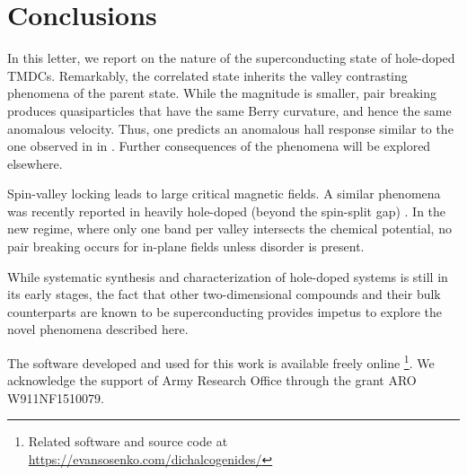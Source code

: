 \section{Conclusions}

In this letter, we report on the nature of the superconducting state
of hole-doped TMDCs.
Remarkably, the correlated state inherits
the valley contrasting phenomena of the parent state.
While the magnitude is smaller, pair breaking produces quasiparticles
that have the same Berry curvature, and hence the same anomalous velocity.
Thus, one predicts an anomalous hall response similar to
the one observed in in .
Further consequences of the phenomena will be explored elsewhere.

Spin-valley locking leads to large critical magnetic fields.
A similar phenomena was recently reported in heavily hole-doped
(beyond the spin-split gap) .
In the new regime, where only one band per valley intersects
the chemical potential, no pair breaking occurs
for in-plane fields unless disorder is present.

While systematic synthesis and characterization of hole-doped systems
is still in its early stages, the fact that other two-dimensional compounds
and their bulk counterparts are known to be superconducting
provides impetus to explore the novel phenomena described here.

The software developed and used for this work
is available freely online
\footnote{%
  Related software and source code at \\
  \url{https://evansosenko.com/dichalcogenides/}
}.
We acknowledge the support of Army Research Office through the grant
ARO W911NF1510079.
